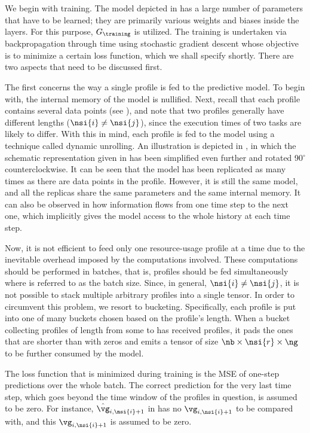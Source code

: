 We begin with training. The model depicted in  has
a large number of parameters that have to be learned; they are primarily various
weights and biases inside the layers. For this purpose, $G_\training$ is
utilized. The training is undertaken via backpropagation through time using
stochastic gradient descent \cite{goodfellow2016} whose objective is to minimize
a certain loss function, which we shall specify shortly. There are two aspects
that need to be discussed first.

The first concerns the way a single profile is fed to the predictive model. To
begin with, the internal memory of the model is nullified. Next, recall that
each profile contains several data points (see ), and note
that two profiles generally have different lengths ($\nsi{i} \neq \nsi{j}$),
since the execution times of two tasks are likely to differ. With this in mind,
each profile is fed to the model using a technique called dynamic unrolling. An
illustration is depicted in , in which the schematic
representation given in  has been simplified even
further and rotated 90${}^\circ$ counterclockwise. It can be seen that the model
has been replicated as many times as there are data points in the profile.
However, it is still the same model, and all the replicas share the same
parameters and the same internal memory. It can also be observed in
 how information flows from one time step to the next
one, which implicitly gives the model access to the whole history at each time
step.

Now, it is not efficient to feed only one resource-usage profile at a time due
to the inevitable overhead imposed by the computations involved. These
computations should be performed in batches, that is, \nb profiles should be fed
simultaneously where \nb is referred to as the batch size. Since, in general,
$\nsi{i} \neq \nsi{j}$, it is not possible to stack multiple arbitrary profiles
into a single tensor. In order to circumvent this problem, we resort to
bucketing. Specifically, each profile is put into one of many buckets chosen
based on the profile's length. When a bucket collecting profiles of length from
some  to  has received \nb profiles, it pads the ones that are
shorter than  with zeros and emits a tensor of size $\nb \times \nsi{r}
\times \ng$ to be further consumed by the model.

The loss function that is minimized during training is the \ac{MSE} of one-step
predictions over the whole batch. The correct prediction for the very last time
step, which goes beyond the time window of the profiles in question, is assumed
to be zero. For instance, $\hat{\vg}_{i, \nsi{i} + 1}$ in
 has no $\vg_{i, \nsi{i} + 1}$ to be compared with,
and this $\vg_{i, \nsi{i} + 1}$ is assumed to be zero.

